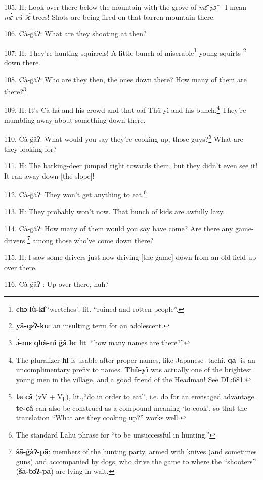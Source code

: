 105. H: Look over there below the mountain with the grove of \textit{mɛ̄-pɔ̂
}-- I mean \textit{mɛ̀-cû-šɛ́} trees! Shots are being fired on that barren
mountain there.

106. Cà-g̈âʔ: What are they shooting at then?

107. H: They're hunting squirrels! A little bunch of miserable\footnote{\textbf{chɔ} \textbf{lù-kɨ̂} `wretches'; lit. ``ruined and rotten people''.} young squirts
\footnote{\textbf{yâ-qɛ̀ʔ-ku}: an insulting term for an adolescent.} down there.

108. Cà-g̈âʔ: Who are they then, the ones down there? How many of them are
there?\footnote{\textbf{ɔ̀-mɛ} \textbf{qhà-nî} \textbf{g̈â} \textbf{le}: lit. ``how many names are there?''}

109. H: It's Cà-há and his crowd and that oaf Thû-yì and his bunch.\footnote{The pluralizer \textbf{hɨ} is usable after proper names, like Japanese -tachi. \textbf{qā}- is an uncomplimentary prefix to names. \textbf{Thû-yì} was actually one of the brightest young men in the village, and a good friend of the Headman! See DL:681.} They're
mumbling away about something down there.

110. Cà-g̈âʔ: What would you say they're cooking up, those guys?\footnote{\textbf{te} \textbf{câ} (vV + V\textsubscript{h}), lit.,``do in order to eat'', i.e. do for an envisaged advantage. \textbf{te-câ} can also be construed as a compound meaning `to cook', so that the translation ``What are they cooking up?'' works well.} What
are they looking for?

111. H: The barking-deer jumped right towards them, but they didn't even see it!
It ran away down [the slope]!

112. Cà-g̈âʔ: They won't get anything to eat.\footnote{The standard Lahu phrase for ``to be unsuccessful in hunting.''}

113. H: They probably won't now. That bunch of kids are awfully lazy.

114. Cà-g̈âʔ: How many of them would you say have come? Are there any game-drivers
\footnote{\textbf{šā-g̈àʔ-pā}: members of the hunting party, armed with knives (and sometimes guns) and accompanied by dogs, who drive the game to where the ``shooters'' (\textbf{šā-bɔ̂ʔ-pā}) are lying in wait.} among those who've come down there?

115. H: I saw some drivers just now driving [the game] down from an old field up
over there.

116. Cà-g̈âʔ : Up over there, huh?

